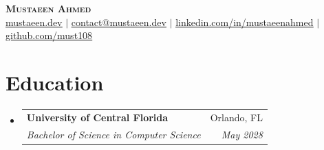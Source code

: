 \documentclass[letterpaper,11pt]{article}
\makeatletter
\newcommand{\resumeSubheading}[4]{
  \vspace{-2pt}\item
    \begin{tabular*}{0.97\textwidth}[t]{l@{\extracolsep{\fill}}r}
      \textbf{#1} & #2 \\
      \textit{\small#3} & \textit{\small #4} \\
    \end{tabular*}\vspace{-7pt}
}
\newcommand{\resumeSubHeadingListStart}{\begin{itemize}[leftmargin=0.15in, label={}]}
\newcommand{\resumeSubHeadingListEnd}{\end{itemize}}
\makeatother
\begin{document}

\vspace*{-0.65in} %
\begin{center}
    \textbf{\scshape Mustaeen Ahmed} \\ \vspace{1pt}
    \href{https://mustaeen.dev}{\ul{mustaeen.dev}} $|$ 
    \href{mailto:contact@mustaeen.dev}{\ul{contact@mustaeen.dev}} $|$ 
    \href{https://linkedin.com/in/mustaeenahmed}{\ul{linkedin.com/in/mustaeenahmed}} $|$
    \href{https://github.com/must108}{\ul{github.com/must108}} 
\end{center}


\vspace*{-0.24in} %
\section{Education}
  \resumeSubHeadingListStart
    \resumeSubheading
      {University of Central Florida}{Orlando, FL}
      {Bachelor of Science in Computer Science}{May 2028}
      
  \resumeSubHeadingListEnd

\end{document}
